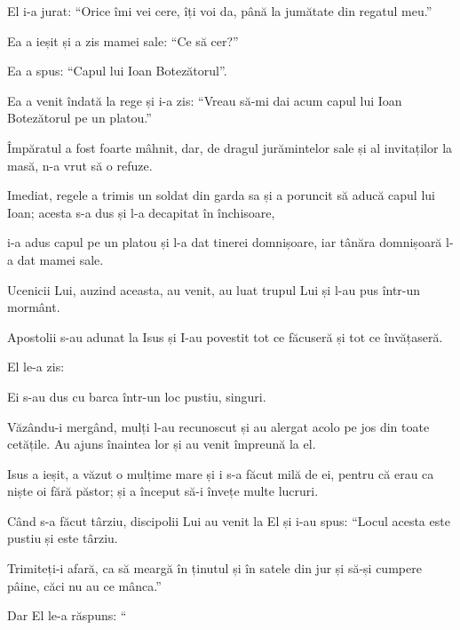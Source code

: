 {El i-a jurat: “Orice îmi vei cere, îți voi da, până la jumătate din regatul meu.”


\par }{\PP {}Ea a ieșit și a zis mamei sale: “Ce să cer?”

\par }{\PP Ea a spus: “Capul lui Ioan Botezătorul”.


\par }{\PP {}Ea a venit îndată la rege și i-a zis: “Vreau să-mi dai acum capul lui Ioan Botezătorul pe un platou.”


\par }{\PP {}Împăratul a fost foarte mâhnit, dar, de dragul jurămintelor sale și al invitaților la masă, n-a vrut să o refuze.

Imediat, regele a trimis un soldat din garda sa și a poruncit să aducă capul lui Ioan; acesta s-a dus și l-a decapitat în închisoare,

i-a adus capul pe un platou și l-a dat tinerei domnișoare, iar tânăra domnișoară l-a dat mamei sale.


\par }{\PP {}Ucenicii Lui, auzind aceasta, au venit, au luat trupul Lui și l-au pus într-un mormânt.


\par }{\PP {}Apostolii s-au adunat la Isus și I-au povestit tot ce făcuseră și tot ce învățaseră.

El le-a zis:
{}

Ei s-au dus cu barca într-un loc pustiu, singuri.

Văzându-i mergând, mulți l-au recunoscut și au alergat acolo pe jos din toate cetățile. Au ajuns înaintea lor și au venit împreună la el.

Isus a ieșit, a văzut o mulțime mare și i s-a făcut milă de ei, pentru că erau ca niște oi fără păstor; și a început să-i învețe multe lucruri.

Când s-a făcut târziu, discipolii Lui au venit la El și i-au spus: “Locul acesta este pustiu și este târziu.

Trimiteți-i afară, ca să meargă în ținutul și în satele din jur și să-și cumpere pâine, căci nu au ce mânca.”


\par }{\PP {}Dar El le-a răspuns: “{}

}
